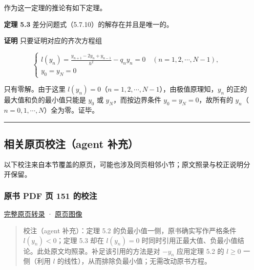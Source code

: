 \documentclass[
  10pt,
  fontset=fandol]{ctexart}
\begin{document}
作为这一定理的推论有如下定理。

\textbf{定理 5.3} 差分问题式（5.7.10）的解存在并且是唯一的。

\textbf{证明} 只要证明对应的齐次方程组

\[
\begin{cases}
\displaystyle l(y_n)=\frac{y_{n+1}-2y_n+y_{n-1}}{h^2}-q_ny_n=0\quad(n=1,2,\cdots,N-1),\\[6pt]
y_0=y_N=0
\end{cases}
\]

只有零解。由于这里 \(l(y_n)=0\)（\(n=1,2,\cdots,N-1\)），由极值原理知，\(y_n\) 的正的最大值和负的最小值只能是 \(y_0\) 或 \(y_N\)，而按边界条件 \(y_0=y_N=0\)，故所有的 \(y_n\)（\(n=0,1,\cdots,N\)）全为零。证毕。

\begin{center}\rule{0.5\linewidth}{0.5pt}\end{center}

\subsection{相关原页校注（agent 补充）}\label{ux76f8ux5173ux539fux9875ux6821ux6ce8agent-ux8865ux5145}

以下校注来自本节覆盖的原页，可能也涉及同页相邻小节；原文照录与校正说明分开保留。

\subsubsection{原书 PDF 页 151 的校注}\label{ux539fux4e66-pdf-ux9875-151-ux7684ux6821ux6ce8}

\href{../pages/pdf-151.md}{完整原页转录} · \href{../../source-images/pdf-151.jpeg}{原页图像}

\begin{quote}
校注（agent 补充）：定理 5.2 的负最小值一侧，原书确实写作严格条件 \(l(y_n)<0\)；定理 5.3 却在 \(l(y_n)=0\) 时同时引用正最大值、负最小值结论。此处原文均照录。补足该引用的方法是对 \(-y_n\) 应用定理 5.2 的 \(l\ge0\) 一侧（利用 \(l\) 的线性），从而排除负最小值；无需改动原书方程。
\end{quote}
\end{document}
